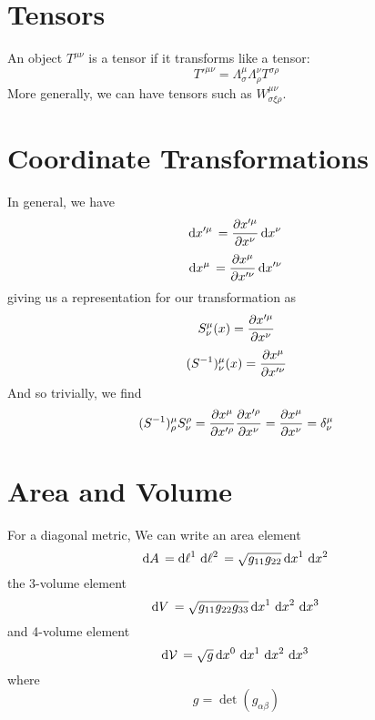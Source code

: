 \section{Tensors}
An object \(T^{\mu\nu}\) is a tensor if it transforms like a tensor:
\begin{equation}
	T'^{\mu\nu} = \Lambda_{\sigma}^\mu\Lambda_\rho^\nu T^{\sigma\rho}
\end{equation}
More generally, we can have tensors such as \(W^{\mu\nu}_{\sigma\xi\rho}\).
\section{Coordinate Transformations}
In general, we have
\[\d{x'^\mu} = \pder{x'^\mu}{x^\nu}\d{x^\nu}\]
\[\d{x^\mu} = \pder{x^\mu}{x'^\nu}\d{x'^\nu}\]
giving us a representation for our transformation as
\[S_\nu^\mu(x) = \frac{\partial x'^\mu}{\partial x^\nu}\]
\[(S^{-1})_\nu^\mu(x) = \frac{\partial x^\mu}{\partial x'^\nu}\]
And so trivially, we find
\[(S^{-1})^\mu_\rho S^\rho_\nu = \frac{\partial x^\mu}{\partial x'^\rho}\frac{\partial x'^\rho}{\partial x^\nu} = \frac{\partial x^\mu}{\partial x^\nu} = \delta_\nu^\mu\]
\section{Area and Volume}
For a diagonal metric,
We can write an area element
\[\d{A} = \d{\ell^1}\d{\ell^2} = \sqrt{g_{11}g_{22}}\d{x^1}\d{x^2}\]
the 3-volume element
\[\d{V} = \sqrt{g_{11}g_{22}g_{33}}\d{x^1}\d{x^2}\d{x^3}\]
and 4-volume element
\[\d{\mathcal V} = \sqrt{g}\d{x^0}\d{x^1}\d{x^2}\d{x^3}\]
where 
\[g = \det(g_{\alpha\beta})\]
